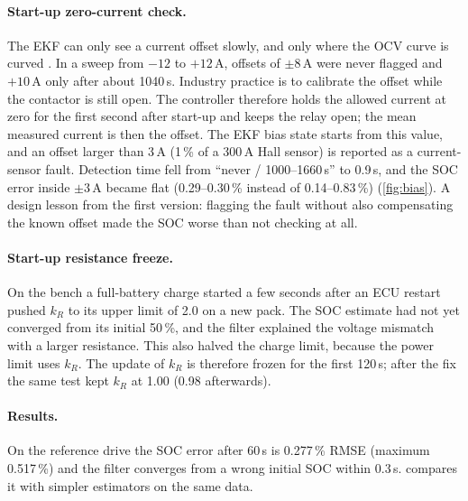 \paragraph{Start-up zero-current check.} The EKF can only see a current offset slowly, and only where the OCV curve is curved \citep{zhao2017}. In a sweep from $-12$ to $+12$\,A, offsets of $\pm8$\,A were never flagged and $+10$\,A only after about 1040\,s. Industry practice is to calibrate the offset while the contactor is still open. The controller therefore holds the allowed current at zero for the first second after start-up and keeps the relay open; the mean measured current is then the offset. The EKF bias state starts from this value, and an offset larger than 3\,A (1\,\% of a 300\,A Hall sensor) is reported as a current-sensor fault. Detection time fell from ``never / 1000--1660\,s'' to 0.9\,s, and the SOC error inside $\pm3$\,A became flat (0.29--0.30\,\% instead of 0.14--0.83\,\%) (\cref{fig:bias}). A design lesson from the first version: flagging the fault without also compensating the known offset made the SOC worse than not checking at all.


\paragraph{Start-up resistance freeze.} On the bench a full-battery charge started a few seconds after an ECU restart pushed $k_R$ to its upper limit of 2.0 on a new pack. The SOC estimate had not yet converged from its initial 50\,\%, and the filter explained the voltage mismatch with a larger resistance. This also halved the charge limit, because the power limit uses $k_R$. The update of $k_R$ is therefore frozen for the first 120\,s; after the fix the same test kept $k_R$ at 1.00 (0.98 afterwards).

\paragraph{Results.} On the reference drive the SOC error after 60\,s is 0.277\,\% RMSE (maximum 0.517\,\%) and the filter converges from a wrong initial SOC within 0.3\,s.  compares it with simpler estimators on the same data.

